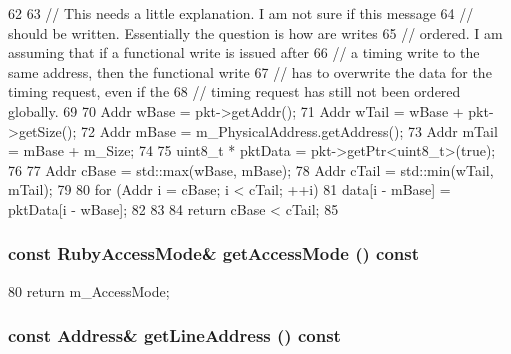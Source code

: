 \begin{DoxyCode}
62 {
63     // This needs a little explanation. I am not sure if this message
64     // should be written. Essentially the question is how are writes
65     // ordered. I am assuming that if a functional write is issued after
66     // a timing write to the same address, then the functional write
67     // has to overwrite the data for the timing request, even if the
68     // timing request has still not been ordered globally.
69 
70     Addr wBase = pkt->getAddr();
71     Addr wTail = wBase + pkt->getSize();
72     Addr mBase = m_PhysicalAddress.getAddress();
73     Addr mTail = mBase + m_Size;
74 
75     uint8_t * pktData = pkt->getPtr<uint8_t>(true);
76 
77     Addr cBase = std::max(wBase, mBase);
78     Addr cTail = std::min(wTail, mTail);
79 
80     for (Addr i = cBase; i < cTail; ++i) {
81         data[i - mBase] = pktData[i - wBase];
82     }
83 
84     return cBase < cTail;
85 }
\end{DoxyCode}
\hypertarget{classRubyRequest_ada8f61552814cdc121bec32f1ec92660}{
\subsubsection[{getAccessMode}]{\setlength{\rightskip}{0pt plus 5cm}const RubyAccessMode\& getAccessMode () const}}
\label{classRubyRequest_ada8f61552814cdc121bec32f1ec92660}



\begin{DoxyCode}
80 { return m_AccessMode; }
\end{DoxyCode}
\hypertarget{classRubyRequest_a6cefddc635a0735c8131dbef85b4231c}{
\subsubsection[{getLineAddress}]{\setlength{\rightskip}{0pt plus 5cm}const {\bf Address}\& getLineAddress () const}}
\label{classRubyRequest_a6cefddc635a0735c8131dbef85b4231c}



